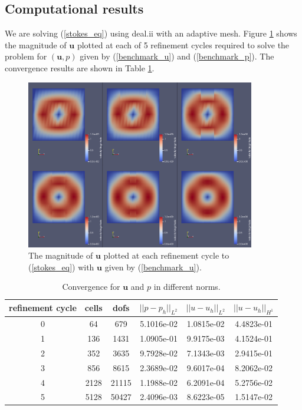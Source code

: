 \documentclass[12pt,a4paper]{article}
\theoremstyle{definition}
\begin{document}
\subsection{Computational results}
We are solving (\ref{stokes_eq}) using deal.ii with an adaptive mesh.  Figure \ref{fig_stokes_sol}  shows the magnitude of $\textbf{u}$ plotted at each of 5 refinement cycles required to solve the problem for $\left(\textbf{u}, p\right)$ given by (\ref{benchmark_u}) and (\ref{benchmark_p}).  The convergence results are shown in Table \ref{tablebenchmark_convergence}.
\begin{figure}[H]
	\centering
	\includegraphics[width=10cm]{stokes_cg_velocities}
	\caption{The magnitude of $\textbf{u}$ plotted at each refinement cycle to (\ref{stokes_eq}) with $\textbf{u}$ given by (\ref{benchmark_u}).}
	\label{fig_stokes_sol}
\end{figure}
\begin{table}[H]
	\begin{center}
		\begin{tabular}{|c|c|c|c|c|c|} \hline
	refinement cycle & cells & dofs & $||p-p_h||_{L^2}$ & $||u-u_h||_{L^2}$ & $||u-u_h||_{H^1}$\\ \hline
0 & 64 & 679 & 5.1016e-02 & 1.0815e-02 & 4.4823e-01\\ \hline
1 & 136 & 1431 & 1.0905e-01 & 9.9175e-03 & 4.1524e-01\\ \hline
2 & 352 & 3635 & 9.7928e-02 & 7.1343e-03 & 2.9415e-01\\ \hline
3 & 856 & 8615 & 2.3689e-02 & 9.6017e-04 & 8.2062e-02\\ \hline
4 & 2128 & 21115 & 1.1988e-02 & 6.2091e-04 & 5.2756e-02\\ \hline
5 & 5128 & 50427 & 2.4096e-03 & 8.6223e-05 & 1.5147e-02\\ \hline
		\end{tabular}
	\caption{Convergence for $\textbf{u}$ and $p$ in different norms.}
	\label{tablebenchmark_convergence}
	\end{center}
\end{table}
\end{document}
